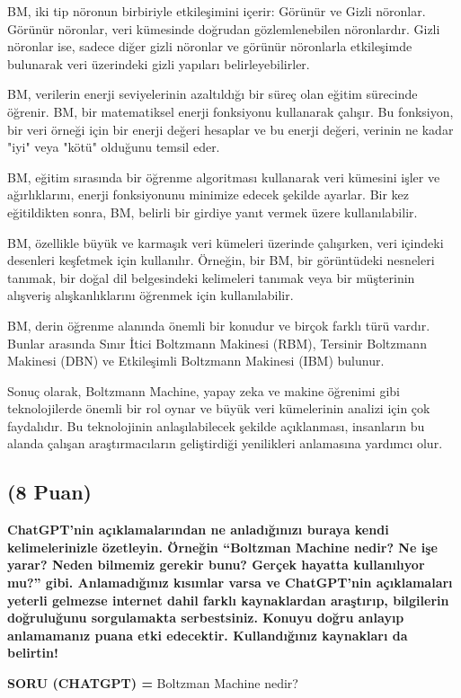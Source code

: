 \documentclass[11pt]{article}
\begin{document}
BM, iki tip nöronun birbiriyle etkileşimini içerir: Görünür ve Gizli nöronlar. Görünür nöronlar, veri kümesinde doğrudan gözlemlenebilen nöronlardır. Gizli nöronlar ise, sadece diğer gizli nöronlar ve görünür nöronlarla etkileşimde bulunarak veri üzerindeki gizli yapıları belirleyebilirler.

BM, verilerin enerji seviyelerinin azaltıldığı bir süreç olan eğitim sürecinde öğrenir. BM, bir matematiksel enerji fonksiyonu kullanarak çalışır. Bu fonksiyon, bir veri örneği için bir enerji değeri hesaplar ve bu enerji değeri, verinin ne kadar "iyi" veya "kötü" olduğunu temsil eder.

BM, eğitim sırasında bir öğrenme algoritması kullanarak veri kümesini işler ve ağırlıklarını, enerji fonksiyonunu minimize edecek şekilde ayarlar. Bir kez eğitildikten sonra, BM, belirli bir girdiye yanıt vermek üzere kullanılabilir.

BM, özellikle büyük ve karmaşık veri kümeleri üzerinde çalışırken, veri içindeki desenleri keşfetmek için kullanılır. Örneğin, bir BM, bir görüntüdeki nesneleri tanımak, bir doğal dil belgesindeki kelimeleri tanımak veya bir müşterinin alışveriş alışkanlıklarını öğrenmek için kullanılabilir.

BM, derin öğrenme alanında önemli bir konudur ve birçok farklı türü vardır. Bunlar arasında Sınır İtici Boltzmann Makinesi (RBM), Tersinir Boltzmann Makinesi (DBN) ve Etkileşimli Boltzmann Makinesi (IBM) bulunur.

Sonuç olarak, Boltzmann Machine, yapay zeka ve makine öğrenimi gibi teknolojilerde önemli bir rol oynar ve büyük veri kümelerinin analizi için çok faydalıdır. Bu teknolojinin anlaşılabilecek şekilde açıklanması, insanların bu alanda çalışan araştırmacıların geliştirdiği yenilikleri anlamasına yardımcı olur.

\subsection{(8 Puan)} \textbf{ChatGPT’nin açıklamalarından ne anladığınızı buraya kendi kelimelerinizle özetleyin. Örneğin ``Boltzman Machine nedir? Ne işe yarar? Neden bilmemiz gerekir bunu? Gerçek hayatta kullanılıyor mu?'' gibi. Anlamadığınız kısımlar varsa ve ChatGPT’nin açıklamaları yeterli gelmezse internet dahil farklı kaynaklardan araştırıp, bilgilerin doğruluğunu sorgulamakta serbestsiniz. Konuyu doğru anlayıp anlamamanız puana etki edecektir. Kullandığınız kaynakları da belirtin!}

\textbf{SORU (CHATGPT) =} Boltzman Machine nedir?
\end{document}
